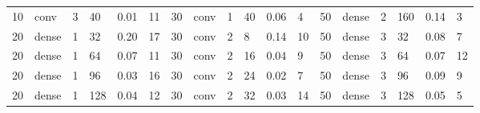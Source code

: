 \begin{table}[t!]
{\begin{tabular}{@{}llllll|llllll|llllll@{}}
10                              & conv                           & 3                              & 40                             & 0.01                             & 11                                & 30                              & conv                           & 1                              & 40                             & 0.06                           & 4                                 & 50                              & dense                          & 2                              & 160                            & 0.14                           & 3                                \\
20                              & dense                          & 1                              & 32                             & 0.20                             & 17                                & 30                              & conv                           & 2                              & 8                              & 0.14                           & 10                                & 50                              & dense                          & 3                              & 32                             & 0.08                           & 7                                \\
20                              & dense                          & 1                              & 64                             & 0.07                             & 11                                & 30                              & conv                           & 2                              & 16                             & 0.04                           & 9                                 & 50                              & dense                          & 3                              & 64                             & 0.07                           & 12                               \\
20                              & dense                          & 1                              & 96                             & 0.03                             & 16                                & 30                              & conv                           & 2                              & 24                             & 0.02                           & 7                                 & 50                              & dense                          & 3                              & 96                             & 0.09                           & 9                                \\
20                              & dense                          & 1                              & 128                            & 0.04                             & 12                                & 30                              & conv                           & 2                              & 32                             & 0.03                           & 14                                & 50                              & dense                          & 3                              & 128                            & 0.05                           & 5                                \\

\end{tabular}}
\end{table}
